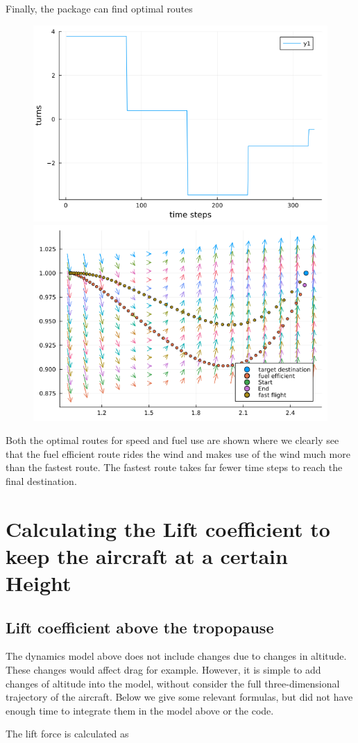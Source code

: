 \documentclass{article}
\begin{document}
Finally, the package can find optimal routes

\begin{figure}
    \centering
    \includegraphics[width = 0.49\linewidth]{../imgs/readme-4.png}
    \includegraphics[width = 0.49\linewidth]{../imgs/readme-5.png}
\end{figure}

Both the optimal routes for speed and fuel use are shown  where we clearly see that the fuel efficient route rides the wind and makes use of the wind much more than the fastest route. The fastest route takes far fewer time steps to reach the final destination. 


\section{Calculating the Lift coefficient to keep the aircraft at a certain Height}

\subsection{Lift coefficient above the tropopause}

The dynamics model above does not include changes due to changes in altitude. These changes would affect drag for example. However, it is simple to add changes of altitude into the model, without consider the full three-dimensional trajectory of the aircraft. Below we give some relevant formulas, but did not have enough time to integrate them in the model above or the code.  

The lift force is calculated as  \cite{nuic2004bada} 
\end{document}
